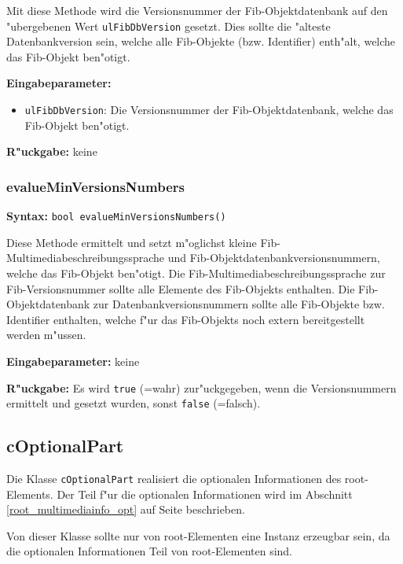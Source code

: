 \bigskip\noindent
Mit diese Methode wird die Versionsnummer der Fib-Objektdatenbank auf den "ubergebenen Wert \verb|ulFibDbVersion| gesetzt. Dies sollte die "alteste Datenbankversion sein, welche alle Fib-Objekte (bzw. Identifier) enth"alt, welche das Fib-Objekt ben"otigt.

\bigskip\noindent
\textbf{Eingabeparameter:}
\begin{itemize}
 \item \verb|ulFibDbVersion|: Die Versionsnummer der Fib-Objektdatenbank, welche das Fib-Objekt ben"otigt.
\end{itemize}

\bigskip\noindent
\textbf{R"uckgabe:} keine


\subsubsection{evalueMinVersionsNumbers}

\textbf{Syntax:} \verb|bool evalueMinVersionsNumbers()|

\bigskip\noindent
Diese Methode ermittelt und setzt m"oglichst kleine Fib-Multi\-media\-be\-schrei\-bungs\-sprache und Fib-Objektdatenbankversionsnummern,  welche das Fib-Objekt ben"otigt. Die Fib-Multimediabeschreibungssprache zur Fib-Versionsnummer sollte alle Elemente des Fib-Objekts enthalten. Die Fib-Objektdatenbank zur Datenbankversionsnummern sollte alle Fib-Objekte bzw. Identifier enthalten, welche f"ur das Fib-Objekts noch extern bereitgestellt werden m"ussen.

\bigskip\noindent
\textbf{Eingabeparameter:} keine

\bigskip\noindent
\textbf{R"uckgabe:} Es wird \verb|true| (=wahr) zur"uckgegeben, wenn die Versionsnummern ermittelt und gesetzt wurden, sonst \verb|false| (=falsch).


\subsection{cOptionalPart}

Die Klasse \verb|cOptionalPart| realisiert die optionalen Informationen des root-Elements. Der Teil f"ur die optionalen Informationen wird im Abschnitt \ref{root_multimediainfo_opt} auf Seite \pageref{root_multimediainfo_opt} beschrieben.

Von dieser Klasse sollte nur von root-Elementen eine Instanz erzeugbar sein, da die optionalen Informationen Teil von root-Elementen sind.

